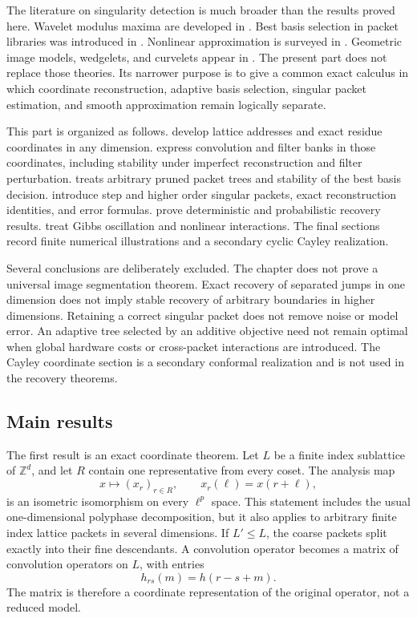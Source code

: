 \documentclass[11pt,letterpaper]{article}
\theoremstyle{plain}
\theoremstyle{plain}
\theoremstyle{plain}
\theoremstyle{definition}
\theoremstyle{definition}
\theoremstyle{definition}
\theoremstyle{definition}
\theoremstyle{remark}
\theoremstyle{remark}
\theoremstyle{remark}
\theoremstyle{remark}
\newcommand{\ZZ}{\mathbb Z}
\begin{document}
The literature on singularity detection is much broader than the results proved here. Wavelet modulus maxima are developed in \cite{MallatHwang1992}. Best basis selection in packet libraries was introduced in \cite{CoifmanWickerhauser1992}. Nonlinear approximation is surveyed in \cite{DeVore1998}. Geometric image models, wedgelets, and curvelets appear in \cite{Donoho1999,CandesDonoho2004}. The present part does not replace those theories. Its narrower purpose is to give a common exact calculus in which coordinate reconstruction, adaptive basis selection, singular packet estimation, and smooth approximation remain logically separate.

This part is organized as follows.  develop lattice addresses and exact residue coordinates in any dimension.  express convolution and filter banks in those coordinates, including stability under imperfect reconstruction and filter perturbation.  treats arbitrary pruned packet trees and stability of the best basis decision.  introduce step and higher order singular packets, exact reconstruction identities, and error formulas.  prove deterministic and probabilistic recovery results.  treat Gibbs oscillation and nonlinear interactions. The final sections record finite numerical illustrations and a secondary cyclic Cayley realization.

Several conclusions are deliberately excluded. The chapter does not prove a universal image segmentation theorem. Exact recovery of separated jumps in one dimension does not imply stable recovery of arbitrary boundaries in higher dimensions. Retaining a correct singular packet does not remove noise or model error. An adaptive tree selected by an additive objective need not remain optimal when global hardware costs or cross-packet interactions are introduced. The Cayley coordinate section is a secondary conformal realization and is not used in the recovery theorems.

\subsection{Main results}

The first result is an exact coordinate theorem. Let \(L\) be a finite index sublattice of \(\ZZ^d\), and let \(R\) contain one representative from every coset. The analysis map
\[
x\longmapsto (x_r)_{r\in R},
\qquad
x_r(\ell)=x(r+\ell),
\]
is an isometric isomorphism on every \(\ell^p\) space. This statement includes the usual one-dimensional polyphase decomposition, but it also applies to arbitrary finite index lattice packets in several dimensions. If \(L'\leq L\), the coarse packets split exactly into their fine descendants. A convolution operator becomes a matrix of convolution operators on \(L\), with entries
\[
h_{rs}(m)=h(r-s+m).
\]
The matrix is therefore a coordinate representation of the original operator, not a reduced model.
\end{document}
